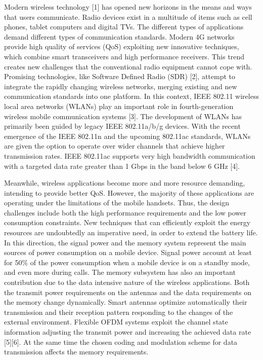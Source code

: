 Modern wireless technology [1] has opened new horizons in the means and ways that users communicate. Radio devices exist in a multitude of items such as cell phones, tablet computers and digital TVs. The different types of applications demand different types of communication standards. Modern 4G networks provide high quality of services (QoS) exploiting new innovative techniques, which combine smart transceivers and high performance receivers. This trend creates new challenges that the conventional radio equipment cannot cope with. Promising technologies, like Software Defined Radio (SDR) [2], attempt to integrate the rapidly changing wireless networks, merging existing and new communication standards into one platform. In this context, IEEE 802.11 wireless local area networks (WLANs) play an important role in fourth-generation wireless mobile communication systems [3]. The development of WLANs has primarily been guided by legacy IEEE 802.11a/b/g devices. With the recent emergence of the IEEE 802.11n and the upcoming 802.11ac standards, WLANs are given the option to operate over wider channels that achieve higher transmission rates. IEEE 802.11ac supports very high bandwidth communication with a targeted data rate greater than 1 Gbps in the band below 6 GHz [4].
	
Meanwhile, wireless applications become more and more resource demanding, intending to provide better QoS. However, the majority of these applications are operating under the limitations of the mobile handsets. Thus, the design challenges include both the high performance requirements and the low power consumption constraints. New techniques that can efficiently exploit the energy resources are undoubtedly an imperative need, in order to extend the battery life. In this direction, the signal power and the memory system represent the main sources of power consumption on a mobile device. Signal power account at least for 50\% of the power consumption when a mobile device is on a standby mode, and even more during calls. The memory subsystem has also an important contribution due to the data intensive nature of the wireless applications. Both the transmit power requirements on the antennas and the data requirements on the memory change dynamically. Smart antennas optimize automatically their transmission and their reception pattern responding to the changes of the external environment. Flexible OFDM systems exploit the channel state information adjusting the transmit power and increasing the achieved data rate [5][6]. At the same time the chosen coding and modulation scheme for data transmission affects the memory requirements. 
	
